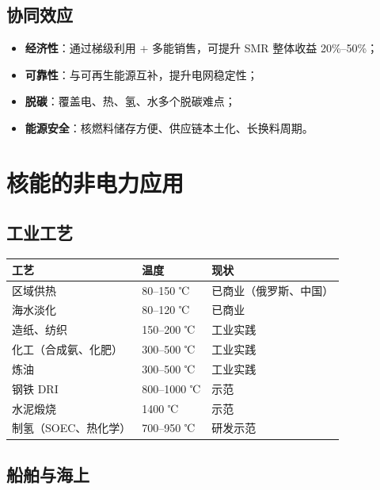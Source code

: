 \documentclass[
  UTF8,
  scheme=plain,
  fontsize=10pt,
  openany
]{ctexbook}
\begin{document}
\subsection{协同效应}\label{ux534fux540cux6548ux5e94}

\begin{itemize}
\tightlist
\item
  \textbf{经济性}：通过梯级利用 + 多能销售，可提升 SMR 整体收益
  20\%--50\%；
\item
  \textbf{可靠性}：与可再生能源互补，提升电网稳定性；
\item
  \textbf{脱碳}：覆盖电、热、氢、水多个脱碳难点；
\item
  \textbf{能源安全}：核燃料储存方便、供应链本土化、长换料周期。
\end{itemize}

\section{核能的非电力应用}\label{ux6838ux80fdux7684ux975eux7535ux529bux5e94ux7528}

\subsection{工业工艺}\label{ux5de5ux4e1aux5de5ux827a}

{\def\LTcaptype{none} %
\begin{longtable}[]{@{}lll@{}}
\toprule\noalign{}
工艺 & 温度 & 现状 \\
\midrule\noalign{}
\endhead
\bottomrule\noalign{}
\endlastfoot
区域供热 & 80--150 ℃ & 已商业（俄罗斯、中国） \\
海水淡化 & 80--120 ℃ & 已商业 \\
造纸、纺织 & 150--200 ℃ & 工业实践 \\
化工（合成氨、化肥） & 300--500 ℃ & 工业实践 \\
炼油 & 300--500 ℃ & 工业实践 \\
钢铁 DRI & 800--1000 ℃ & 示范 \\
水泥煅烧 & 1400 ℃ & 示范 \\
制氢（SOEC、热化学） & 700--950 ℃ & 研发示范 \\
\end{longtable}
}

\subsection{船舶与海上}\label{ux8239ux8236ux4e0eux6d77ux4e0a}
\end{document}
